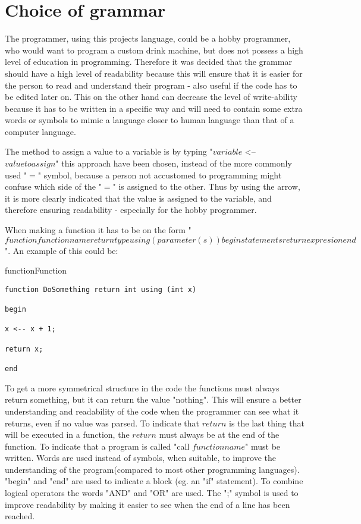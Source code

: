 \section{Choice of grammar}
\label{sec:grammachoice}
The programmer, using this projects language, could be a hobby programmer, who would want to program a custom drink machine, but does not possess a high level of education in programming. Therefore it was decided that the grammar should have a high level of readability because this will ensure that it is easier for the person to read and understand their program - also useful if the code has to be edited later on. This on the other hand can decrease the level of write-ability because it has to be written in a specific way and will need to contain some extra words or symbols to mimic a language closer to human language than that of a computer language.


The method to assign a value to a variable is by typing "$variable$ <-- $value to assign$" this approach have been chosen, instead of the more commonly used "$=$" symbol, because a person not accustomed to programming might confuse which side of the "$=$" is assigned to the other. Thus by using the arrow, it is more clearly indicated that the value is assigned to the variable, and therefore ensuring readability - especially for the hobby programmer.

When making a function it has to be on the form "$function functionname return type using (parameter(s)) begin statements return expresion end$". 
An example of this could be:

\begin{code}{function}{Function}
\begin{lstlisting}
function DoSomething return int using (int x)

begin

x <-- x + 1;

return x;

end
\end{lstlisting}
\end{code}
To get a more symmetrical structure in the code the functions must always return something, but it can return the value "nothing". This will ensure a better understanding and readability of the code when the programmer can see what it returns, even if no value was parsed. To indicate that $return$ is the last thing that will be executed in a function, the $return$ must always be at the end of the function. To indicate that a program is called "call $functionname$" must be written.
Words are used instead of symbols, when suitable, to improve the understanding of the program(compared to most other programming languages).
"begin" and "end" are used to indicate a block (eg. an "if" statement). To combine logical operators the words "AND" and "OR" are used. The ";" symbol is used to improve readability by making it easier to see when the end of a line has been reached.

